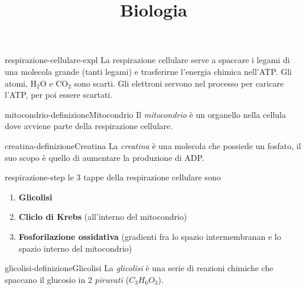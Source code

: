 \documentclass[preview]{standalone}
\begin{document}
\title{Biologia}
\genpage


\begin{snippet}{respirazione-cellulare-expl}
    La respirazione cellulare serve a spaccare i legami di una molecola grande
    (tanti legami) e trasferirne l'energia chimica nell'ATP.
    Gli atomi, H\({}_2\)O e CO\({}_2\) sono scarti. Gli elettroni servono nel processo per caricare l'ATP, per poi
    essere scartati.
\end{snippet}

\begin{snippetdefinition}{mitocondrio-definizione}{Mitocondrio}
    Il \textit{mitocondrio} è un organello nella cellula dove avviene parte della respirazione cellulare.
\end{snippetdefinition}


\begin{snippetdefinition}{creatina-definizione}{Creatina}
    La \textit{creatina} è una molecola che possiede un fosfato, il suo scopo è quello di aumentare la produzione di ADP.
\end{snippetdefinition}

\begin{snippet}{respirazione-step}
    le 3 tappe della respirazione cellulare sono
    \begin{enumerate}
        \item \textbf{Glicolisi}
        \item \textbf{Cliclo di Krebs} (all'interno del mitocondrio)
        \item \textbf{Fosforilazione ossidativa} (gradienti fra lo spazio intermembranan e lo spazio interno del mitocondrio)
    \end{enumerate}
\end{snippet}

\begin{snippetdefinition}{glicolisi-definizione}{Glicolisi}
    La \textit{glicolisi} è una serie di reazioni chimiche che spaccano il glucosio in 2 \textit{piruvati} (\(C_3H_6O_3\)).
\end{snippetdefinition}
\end{document}

